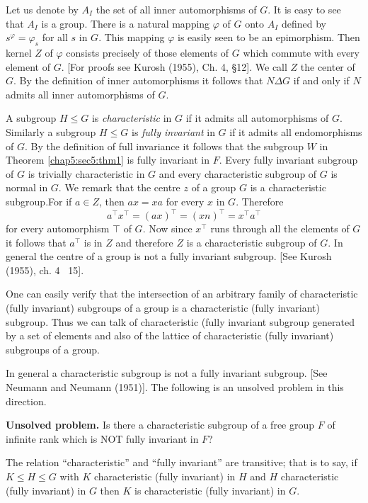  Let us denote by $A_I$ the set of all inner automorphisms of $G$. It
 is easy to see that $A_I$ is a group. There is a natural mapping
 $\varphi$ of $G$ onto $A_I$ defined by $s^\varphi = \varphi_s$ for
 all $s$ in $G$. This mapping $\varphi$ is easily seen to be an
 epimorphism. Then kernel $Z$ of $\varphi$ consists precisely of those
 elements of $G$ which commute with every element of $G$. [For proofs
   see Kurosh (1955), Ch. 4, \S 12]. We call $Z$ the center of
 $G$. By the definition of inner automorphisms it follows that $N
 \Delta G$ if and only if $N$ admits all inner automorphisms of $G$. 
 
A subgroup $H \leq G$ is \textit{characteristic} in $G$ if it admits
all automorphisms of $G$. Similarly a subgroup $H \leq G$ is
\textit{fully invariant} in $G$ if it admits all endomorphisms of
$G$. By the definition of full invariance it follows that the subgroup
$W$ in Theorem \ref{chap5:sec5:thm1} is fully invariant in $F$. Every fully invariant
subgroup of $G$ is trivially characteristic in $G$ and every
characteristic subgroup of $G$ is normal in $G$. We remark that the
centre $z$ of a group $G$ is a characteristic subgroup.\pageoriginale For if $a
\in  Z$, then $ax = xa$ for every $x$ in $G$. Therefore 
$$
a^\top x^\top = (ax)^\top = (xn)^\top = x^\top a^\top
$$
for every automorphism $\top$ of $G$. Now since $x^\top$ runs through
all the elements of $G$ it follows that $a^\top$ is in $Z$ and
therefore $Z$ is a characteristic subgroup of $G$. In general the
centre of a group is not a fully invariant subgroup. [See Kurosh
(1955), ch. 4 ~15]. 
 
One can easily verify that the intersection of an arbitrary family of
characteristic (fully invariant) subgroups of a group is a
characteristic (fully invariant) subgroup. Thus we can talk of
characteristic (fully invariant subgroup generated by a set of
elements and also of the lattice of characteristic (fully invariant)
subgroups of a group. 
 
In general a characteristic subgroup is not a fully invariant
subgroup. [See Neumann and Neumann (1951)]. The following is an
unsolved problem in this direction. 
 
\noindent \textbf{Unsolved problem.} 
  Is there a characteristic subgroup of a free group $F$ of infinite
  rank which is NOT fully invariant in $F$? 
 
\begin{theorem}\label{chap5:sec5:thm2}
  The relation ``characteristic'' and ``fully invariant'' are transitive;
  that is to say, if $K \leq H \leq G$ with $K$ characteristic (fully
  invariant) in $H$ and $H$ characteristic (fully invariant) in $G$
  then $K$ is characteristic (fully invariant) in $G$. 
\end{theorem} 
 
